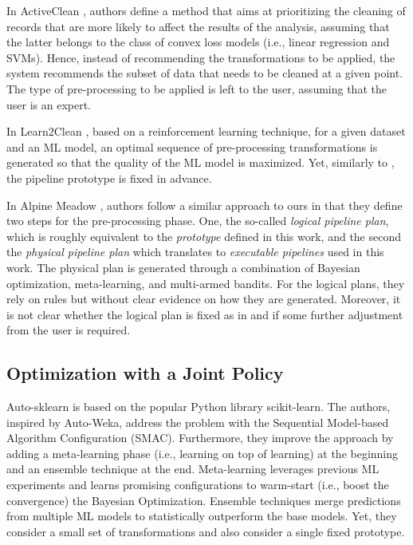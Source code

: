 In ActiveClean \cite{ActiveClean16PVLDB}, authors define a method that aims at prioritizing the cleaning of records that are more likely to affect the results of the analysis, assuming that the latter belongs to the class of convex loss models (i.e., linear regression and SVMs).
Hence, instead of recommending the transformations to be applied, the system recommends the subset of data that needs to be cleaned at a given point.
The type of pre-processing to be applied is left to the user, assuming that the user is an expert.

In Learn2Clean \cite{Berti19WWW}, based on a reinforcement learning technique, for a given dataset and an ML model, an optimal sequence of pre-processing transformations is generated so that the quality of the ML model is maximized.
Yet, similarly to \cite{Quemy20InfSystems}, the pipeline prototype is fixed in advance.

In Alpine Meadow \cite{Shang19SIGMOD}, authors follow a similar approach to ours in that they define two steps for the pre-processing phase. One, the so-called \textit{logical pipeline plan}, which is roughly equivalent to the \textit{prototype} defined in this work, and the second the \textit{physical pipeline plan} which translates to \textit{executable pipelines} used in this work.
The physical plan is generated through a combination of Bayesian optimization, meta-learning, and multi-armed bandits.
For the logical plans, they rely on rules but without clear evidence on how they are generated.
Moreover, it is not clear whether the logical plan is fixed as in \cite{Quemy20InfSystems} and if some further adjustment from the user is required.

\subsection{Optimization with a Joint Policy}
\label{effective-ssec:dpso-cash}
Auto-sklearn \cite{Feurer15AutoSklearn} is based on the popular Python library scikit-learn.
The authors, inspired by Auto-Weka, address the problem with the Sequential Model-based Algorithm Configuration (SMAC).
Furthermore, they improve the approach by adding a meta-learning phase (i.e., learning on top of learning) at the beginning and an ensemble technique at the end.
Meta-learning leverages previous ML experiments and learns promising configurations to warm-start (i.e., boost the convergence) the Bayesian Optimization.
Ensemble techniques merge predictions from multiple ML models to statistically outperform the base models.
Yet, they consider a small set of transformations and also consider a single fixed prototype.

